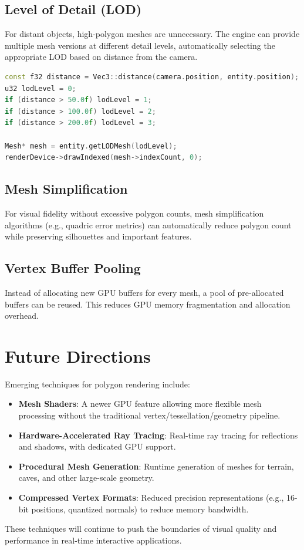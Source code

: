 \subsection{Level of Detail (LOD)}

For distant objects, high-polygon meshes are unnecessary. The engine can provide multiple mesh versions at different detail levels, automatically selecting the appropriate LOD based on distance from the camera.

\begin{lstlisting}[language=C++, caption=LOD Selection]
const f32 distance = Vec3::distance(camera.position, entity.position);
u32 lodLevel = 0;
if (distance > 50.0f) lodLevel = 1;
if (distance > 100.0f) lodLevel = 2;
if (distance > 200.0f) lodLevel = 3;

Mesh* mesh = entity.getLODMesh(lodLevel);
renderDevice->drawIndexed(mesh->indexCount, 0);
\end{lstlisting}

\subsection{Mesh Simplification}

For visual fidelity without excessive polygon counts, mesh simplification algorithms (e.g., quadric error metrics) can automatically reduce polygon count while preserving silhouettes and important features.

\subsection{Vertex Buffer Pooling}

Instead of allocating new GPU buffers for every mesh, a pool of pre-allocated buffers can be reused. This reduces GPU memory fragmentation and allocation overhead.

\section{Future Directions}

Emerging techniques for polygon rendering include:

\begin{itemize}
    \item \textbf{Mesh Shaders}: A newer GPU feature allowing more flexible mesh processing without the traditional vertex/tessellation/geometry pipeline.
    \item \textbf{Hardware-Accelerated Ray Tracing}: Real-time ray tracing for reflections and shadows, with dedicated GPU support.
    \item \textbf{Procedural Mesh Generation}: Runtime generation of meshes for terrain, caves, and other large-scale geometry.
    \item \textbf{Compressed Vertex Formats}: Reduced precision representations (e.g., 16-bit positions, quantized normals) to reduce memory bandwidth.
\end{itemize}

These techniques will continue to push the boundaries of visual quality and performance in real-time interactive applications.
